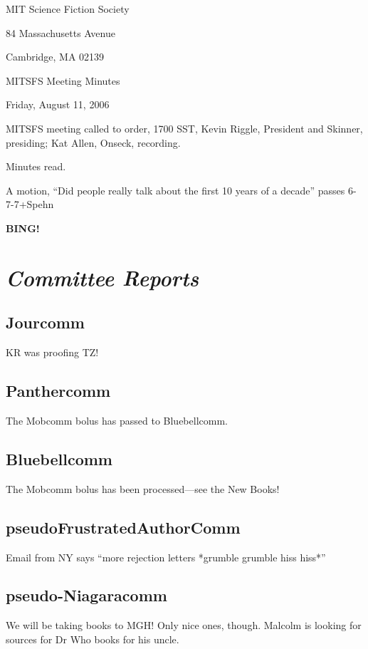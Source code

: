 \documentclass[10pt]{article}
\newcommand{\bing}{{\bf BING!} }
\newcommand{\goto}[1]{\bing \vskip 12pt \section*{{\em{#1}}}}
\begin{document}
\begin{center}

MIT Science Fiction Society

84 Massachusetts Avenue

Cambridge, MA 02139

\vspace{12pt}

MITSFS Meeting Minutes

Friday, August 11, 2006

\end{center}

\vspace{18pt}

\setlength{\parskip}{6pt}

\noindent
MITSFS meeting called to order, 1700 SST,
Kevin Riggle, President and Skinner, presiding; Kat Allen, Onseck, recording.

Minutes read.

A motion, ``Did people really talk about the first 10 years of a
decade'' passes 6-7-7+Spehn

\goto{Committee Reports}

\subsection*{Jourcomm}
KR was proofing TZ!

\subsection{Panthercomm}
The Mobcomm bolus has passed to Bluebellcomm.


\subsection{Bluebellcomm}
The Mobcomm bolus has been processed---see the New Books!


\subsection*{pseudoFrustratedAuthorComm}
Email from NY says ``more rejection letters *grumble grumble hiss hiss*''

\subsection*{pseudo-Niagaracomm}
We will be taking books to MGH! Only nice ones, though.
Malcolm is looking for sources for Dr Who books for his uncle.
\end{document}
